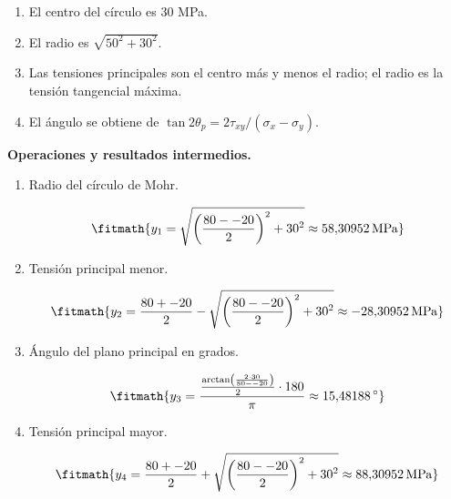 \begin{enumerate}

\item El centro del círculo es $30$ MPa.

\item El radio es $\sqrt{50^2 + 30^2}$.

\item Las tensiones principales son el centro más y menos el radio; el radio es la tensión tangencial máxima.

\item El ángulo se obtiene de $\tan 2\theta_p = 2\tau_{xy}/(\sigma_x - \sigma_y)$.

\end{enumerate}

\noindent\textbf{Operaciones y resultados intermedios.}

\begin{enumerate}

\item Radio del círculo de Mohr.

\[\fitmath{y_{1}=\sqrt{{\left(\frac{80--20}{2}\right)}^{2}+{30}^{2}}\approx 58{,}30952\,\mathrm{MPa}}\]

\item Tensión principal menor.

\[\fitmath{y_{2}=\frac{80+-20}{2}-\sqrt{{\left(\frac{80--20}{2}\right)}^{2}+{30}^{2}}\approx -28{,}30952\,\mathrm{MPa}}\]

\item Ángulo del plano principal en grados.

\[\fitmath{y_{3}=\frac{\frac{\arctan\left(\frac{2\cdot 30}{80--20}\right)}{2}\cdot 180}{\pi}\approx 15{,}48188\,{}^{\circ}}\]

\item Tensión principal mayor.

\[\fitmath{y_{4}=\frac{80+-20}{2}+\sqrt{{\left(\frac{80--20}{2}\right)}^{2}+{30}^{2}}\approx 88{,}30952\,\mathrm{MPa}}\]

\end{enumerate}
